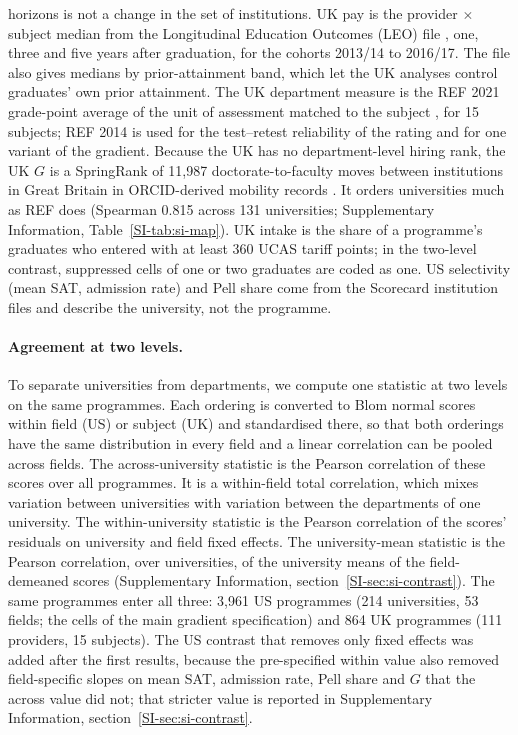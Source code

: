 \documentclass[11pt]{article}
\newcommand{\SIsec}[1]{Supplementary Information, section~\ref{SI-#1}}
\newcommand{\SItab}[1]{Supplementary Information, Table~\ref{SI-#1}}
\begin{document}
horizons is not a change in the set of institutions. UK pay is the provider $\times$ subject median from the
Longitudinal Education Outcomes (LEO) file \citep{dfe_leo_provider}, one, three and five years after graduation, for
the cohorts 2013/14 to 2016/17. The file also gives medians by prior-attainment band, which let the UK analyses control
graduates' own prior attainment. The UK department measure is the REF 2021 grade-point average of the unit of
assessment matched to the subject \citep{ref2021results}, for 15 subjects; REF 2014 is used for the test--retest
reliability of the rating and for one variant of the gradient. Because the UK has no department-level hiring rank, the
UK $G$ is a SpringRank of 11,987 doctorate-to-faculty moves between institutions in Great Britain in ORCID-derived
mobility records \citep{li2026orcid, ror2026data}. It orders universities much as REF does (Spearman 0.815 across 131
universities; \SItab{tab:si-map}). UK intake is the share of a programme's graduates who entered with at least 360
UCAS tariff points; in the two-level contrast, suppressed cells of one or two graduates are coded as one. US
selectivity (mean SAT, admission rate) and Pell share come from the Scorecard institution files and describe the
university, not the programme.

\paragraph{Agreement at two levels.} To separate universities from departments, we compute one statistic at two
levels on the same programmes. Each ordering is converted to Blom normal scores within field (US) or subject (UK) and
standardised there, so that both orderings have the same distribution in every field and a linear correlation can be
pooled across fields. The across-university statistic is the Pearson correlation of these scores over all programmes.
It is a within-field total correlation, which mixes variation between universities with variation between the
departments of one university. The within-university statistic is the Pearson correlation of the scores' residuals on
university and field fixed effects. The university-mean statistic is the Pearson correlation, over universities, of
the university means of the field-demeaned scores (\SIsec{sec:si-contrast}). The same programmes enter all three:
3,961 US programmes (214 universities, 53 fields; the cells of the main gradient specification) and 864 UK programmes
(111 providers, 15 subjects). The US contrast that removes only fixed effects was added after the first results,
because the pre-specified within value also removed field-specific slopes on mean SAT, admission rate, Pell share and
$G$ that the across value did not; that stricter value is reported in \SIsec{sec:si-contrast}.
\end{document}

